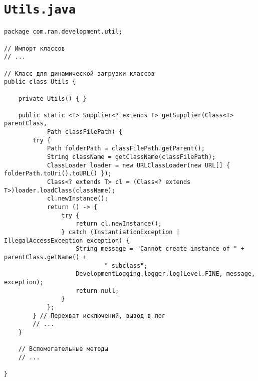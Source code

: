 \section*{\texttt{Utils.java}}
\begin{verbatim}
package com.ran.development.util;

// Импорт классов
// ...

// Класс для динамической загрузки классов
public class Utils {

    private Utils() { }
    
    public static <T> Supplier<? extends T> getSupplier(Class<T> parentClass,
            Path classFilePath) {
        try {
            Path folderPath = classFilePath.getParent();
            String className = getClassName(classFilePath);
            ClassLoader loader = new URLClassLoader(new URL[] { folderPath.toUri().toURL() });
            Class<? extends T> cl = (Class<? extends T>)loader.loadClass(className);
            cl.newInstance();
            return () -> {
                try {
                    return cl.newInstance();
                } catch (InstantiationException | IllegalAccessException exception) {
                    String message = "Cannot create instance of " + parentClass.getName() +
                            " subclass";
                    DevelopmentLogging.logger.log(Level.FINE, message, exception);
                    return null;
                }
            };
        } // Перехват исключений, вывод в лог
        // ...
    }
    
    // Вспомогательные методы
    // ...
    
}
\end{verbatim}